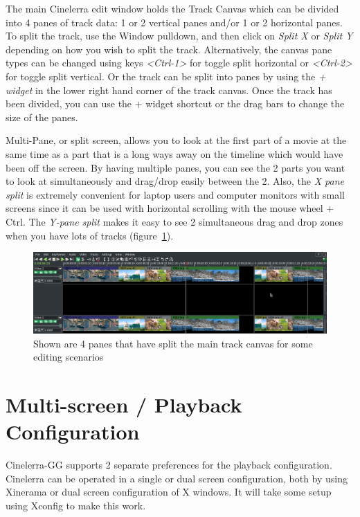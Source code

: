 The main Cinelerra edit window holds the Track Canvas which can be divided into 4 panes of track data: 1 or 2 vertical panes and/or 1 or 2 horizontal panes.  To split the track, use the Window pulldown, and then click on \textit{Split X} or \textit{Split Y} depending on how you wish to split the track.  Alternatively, the canvas pane types can be changed using keys \textit{<Ctrl-1>} for toggle split horizontal or \textit{<Ctrl-2>} for toggle split vertical.  Or the track can be split into panes by using the \textit{+ widget} in the lower right hand corner of the track canvas.  Once the track has been divided, you can use the + widget shortcut or the drag bars to change the size of the panes.

Multi-Pane, or split screen, allows you to look at the first part of a movie at the same time as a part that is a long ways away on the timeline which would have been off the screen.  By having multiple panes, you can see the 2 parts you want to look at simultaneously and drag/drop easily between the 2.  Also, the \textit{X pane split} is extremely convenient for laptop users and computer monitors with small screens since it can be used with horizontal scrolling with the mouse wheel + Ctrl.  The \textit{Y-pane split} makes it easy to see 2 simultaneous drag and drop zones when you have lots of tracks (figure~\ref{fig:multi-pane01}).

\begin{figure}[htpb]
    \centering
    \includegraphics[width=1.0\linewidth]{images/multi-pane01.png}
    \caption{Shown are 4 panes that have split the main track canvas for some editing scenarios}
    \label{fig:multi-pane01}
\end{figure}

\section{Multi-screen / Playback Configuration}%
\label{sec:multiscreen_playback_configuaration}

Cinelerra-GG supports 2 separate preferences for the playback configuration.  Cinelerra can be operated in a single or dual screen configuration, both by using Xinerama or dual screen configuration of X windows.  It will take some setup using Xconfig to make this work.

